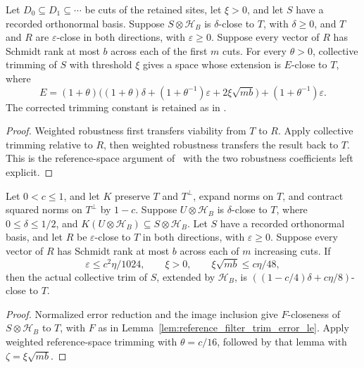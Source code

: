 \begin{lemma}
    \label{lem:reference_trimming_weighted}
    \leanok
    Let $D_0\subseteq D_1\subseteq\cdots$ be cuts of the retained sites,
    let $\xi>0$, and let $S$ have a recorded orthonormal basis.
    Suppose $S\otimes\mathcal H_B$ is $\delta$-close to $T$, with
    $\delta\ge0$, and $T$ and $R$ are $\varepsilon$-close in both
    directions, with $\varepsilon\ge0$. Suppose every vector of $R$ has
    Schmidt rank at most $b$ across each of the first $m$ cuts.
    For every $\theta>0$, collective trimming of $S$ with threshold $\xi$
    gives a space whose extension is $E$-close to $T$, where
    \[
       E=(1+\theta)\bigl((1+\theta)\delta
          +(1+\theta^{-1})\varepsilon+2\xi\sqrt{mb}\bigr)
          +(1+\theta^{-1})\varepsilon.
    \]
    The corrected trimming constant is retained as in
    \cite{gap:alvv16_trimming_constant}.
\end{lemma}
\begin{proof}\leanok
    Weighted robustness first transfers viability from $T$ to $R$.
    Apply collective trimming relative to $R$, then weighted robustness
    transfers the result back to $T$. This is the reference-space argument
    of~\cite[proof of Theorem~t:alg1, lines 1801--1813]{Arad2016RigorousRG}
    with the two robustness coefficients left explicit.
\end{proof}

\begin{lemma}
    \label{lem:reference_filter_trim_step}
    \leanok
    Let $0<c\le1$, and let $K$ preserve $T$ and $T^\perp$, expand norms on
    $T$, and contract squared norms on $T^\perp$ by $1-c$.
    Suppose $U\otimes\mathcal H_B$ is $\delta$-close to $T$, where
    $0\le\delta\le1/2$, and
    $K(U\otimes\mathcal H_B)\subseteq S\otimes\mathcal H_B$.
    Let $S$ have a recorded orthonormal basis, and let $R$ be
    $\varepsilon$-close to $T$ in both directions, with $\varepsilon\ge0$.
    Suppose every vector of $R$ has Schmidt rank at most $b$ across each
    of $m$ increasing cuts. If
    \[
        \varepsilon\le c^2\eta/1024,\qquad
        \xi>0,\qquad \xi\sqrt{mb}\le c\eta/48,
    \]
    then the actual collective trim of $S$, extended by $\mathcal H_B$,
    is $((1-c/4)\delta+c\eta/8)$-close to $T$.
\end{lemma}
\begin{proof}\leanok
    Normalized error reduction and the image inclusion give
    $F$-closeness of $S\otimes\mathcal H_B$ to $T$, with $F$ as in
    Lemma~\ref{lem:reference_filter_trim_error_le}. Apply weighted
    reference-space trimming with $\theta=c/16$, followed by that lemma
    with $\zeta=\xi\sqrt{mb}$.
\end{proof}
